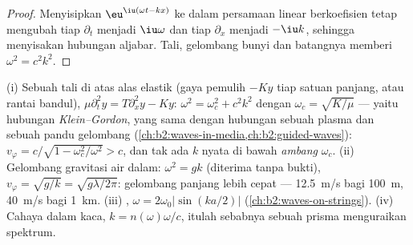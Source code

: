 \begin{proof}
Menyisipkan $\eu^{\iu(\omega t - kx)}$ ke dalam persamaan linear berkoefisien
tetap mengubah tiap $\partial_t$ menjadi $\iu\omega$ dan tiap $\partial_x$ menjadi
$-\iu k$, sehingga menyisakan hubungan aljabar. Tali, gelombang bunyi dan
batangnya memberi $\omega^2 = c^2k^2$.
\end{proof}

\begin{example}\label{ex:b2:dispersion-wave-packets:examples}
(i) Sebuah tali di atas alas elastik (gaya pemulih $-Ky$ tiap satuan panjang,
atau rantai bandul), $\mu\partial_t^2y = T\partial_x^2y - Ky$: $\omega^2 = \omega_c^2
+ c^2k^2$ dengan $\omega_c = \sqrt{K/\mu}$ --- yaitu hubungan
\emph{Klein--Gordon}, yang sama dengan hubungan sebuah plasma dan sebuah pandu gelombang
(\cref{ch:b2:waves-in-media,ch:b2:guided-waves}): $v_\varphi = c/\sqrt{1 -
\omega_c^2/\omega^2} > c$, dan tak ada $k$ nyata di bawah \emph{ambang} $\omega_c$.
(ii) Gelombang gravitasi air dalam: $\omega^2 = gk$ (diterima tanpa bukti), $v_\varphi =
\sqrt{g/k} = \sqrt{g\lambda/2\pi}$: gelombang panjang lebih cepat --- \qty{12.5}{m/s} bagi
\qty{100}{m}, \qty{40}{m/s} bagi \qty{1}{km}. (iii) , $\omega =
2\omega_0|\sin(ka/2)|$ (\cref{ch:b2:waves-on-strings}). (iv) Cahaya dalam kaca,
$k = n(\omega)\omega/c$, itulah sebabnya sebuah prisma menguraikan spektrum.
\end{example}

